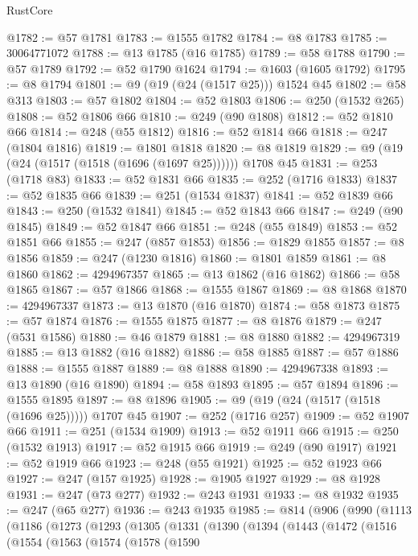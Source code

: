 \begin{lexlean}{RustCore}
\begin{coremodule}
@1782 := @57 @1781
@1783 := @1555 @1782
@1784 := @8 @1783
@1785 := 30064771072
@1788 := @13 @1785 (@16 @1785)
@1789 := @58 @1788
@1790 := @57 @1789
@1792 := @52 @1790 @1624
@1794 := @1603 (@1605 @1792)
@1795 := @8 @1794
@1801 := @9 (@19 (@24 (@1517 @25))) @1524 @45
@1802 := @58 @313
@1803 := @57 @1802
@1804 := @52 @1803
@1806 := @250 (@1532 @265)
@1808 := @52 @1806 @66
@1810 := @249 (@90 @1808)
@1812 := @52 @1810 @66
@1814 := @248 (@55 @1812)
@1816 := @52 @1814 @66
@1818 := @247 (@1804 @1816)
@1819 := @1801 @1818
@1820 := @8 @1819
@1829 := @9 (@19 (@24 (@1517 (@1518 (@1696 (@1697 @25)))))) @1708 @45
@1831 := @253 (@1718 @83)
@1833 := @52 @1831 @66
@1835 := @252 (@1716 @1833)
@1837 := @52 @1835 @66
@1839 := @251 (@1534 @1837)
@1841 := @52 @1839 @66
@1843 := @250 (@1532 @1841)
@1845 := @52 @1843 @66
@1847 := @249 (@90 @1845)
@1849 := @52 @1847 @66
@1851 := @248 (@55 @1849)
@1853 := @52 @1851 @66
@1855 := @247 (@857 @1853)
@1856 := @1829 @1855
@1857 := @8 @1856
@1859 := @247 (@1230 @1816)
@1860 := @1801 @1859
@1861 := @8 @1860
@1862 := 4294967357
@1865 := @13 @1862 (@16 @1862)
@1866 := @58 @1865
@1867 := @57 @1866
@1868 := @1555 @1867
@1869 := @8 @1868
@1870 := 4294967337
@1873 := @13 @1870 (@16 @1870)
@1874 := @58 @1873
@1875 := @57 @1874
@1876 := @1555 @1875
@1877 := @8 @1876
@1879 := @247 (@531 @1586)
@1880 := @46 @1879
@1881 := @8 @1880
@1882 := 4294967319
@1885 := @13 @1882 (@16 @1882)
@1886 := @58 @1885
@1887 := @57 @1886
@1888 := @1555 @1887
@1889 := @8 @1888
@1890 := 4294967338
@1893 := @13 @1890 (@16 @1890)
@1894 := @58 @1893
@1895 := @57 @1894
@1896 := @1555 @1895
@1897 := @8 @1896
@1905 := @9 (@19 (@24 (@1517 (@1518 (@1696 @25))))) @1707 @45
@1907 := @252 (@1716 @257)
@1909 := @52 @1907 @66
@1911 := @251 (@1534 @1909)
@1913 := @52 @1911 @66
@1915 := @250 (@1532 @1913)
@1917 := @52 @1915 @66
@1919 := @249 (@90 @1917)
@1921 := @52 @1919 @66
@1923 := @248 (@55 @1921)
@1925 := @52 @1923 @66
@1927 := @247 (@157 @1925)
@1928 := @1905 @1927
@1929 := @8 @1928
@1931 := @247 (@73 @277)
@1932 := @243 @1931
@1933 := @8 @1932
@1935 := @247 (@65 @277)
@1936 := @243 @1935
@1985 := @814
    (@906
      (@990
        (@1113
          (@1186
            (@1273
              (@1293
                (@1305
                  (@1331
                    (@1390
                      (@1394
                        (@1443
                          (@1472
                            (@1516
                              (@1554
                                (@1563
                                  (@1574
                                    (@1578
                                      (@1590

\end{coremodule}
\end{lexlean}
